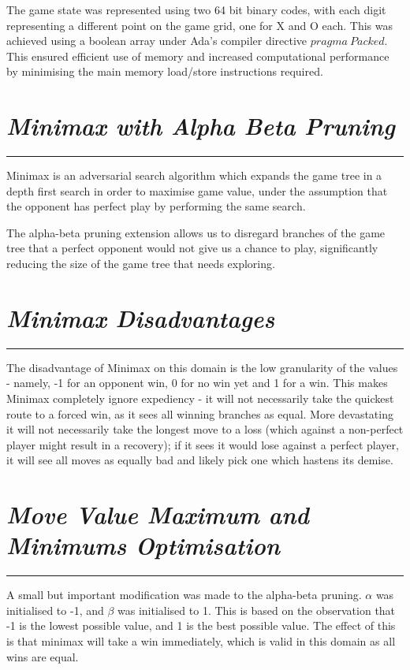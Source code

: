 \documentclass[10pt]{report}
\begin{document}
\begin{multicols}{2}
The game state was represented using two 64 bit binary codes, with each digit representing a different point on the game grid, one for X and O each. This was achieved using a boolean array under Ada's compiler directive $pragma~Packed$. This ensured efficient use of memory and increased computational performance by minimising the main memory load/store instructions required.

\section*{\emph{{Minimax with Alpha Beta Pruning}}}
\hrule
\vspace{0.4cm}

Minimax is an adversarial search algorithm which expands the game tree in a depth first search in order to maximise game value, under the assumption that the opponent has perfect play by performing the same search.

The alpha-beta pruning extension allows us to disregard branches of the game tree that a perfect opponent would not give us a chance to play, significantly reducing the size of the game tree that needs exploring.

\section*{\emph{\textmd{Minimax Disadvantages}}}
\hrule
\vspace{0.4cm}

The disadvantage of Minimax on this domain is the low granularity of the values - namely, -1 for an opponent win, 0 for no win yet and 1 for a win. This makes Minimax completely ignore expediency - it will not necessarily take the quickest route to a forced win, as it sees all winning branches as equal. More devastating it will not necessarily take the longest move to a loss (which against a non-perfect player might result in a recovery); if it sees it would lose against a perfect player, it will see all moves as equally bad and likely pick one which hastens its demise.

\section*{\emph{\textmd{Move Value Maximum and Minimums Optimisation}}}
\hrule
\vspace{0.4cm}

A small but important modification was made to the alpha-beta pruning. $\alpha$ was initialised to -1, and $\beta$ was initialised to 1. This is based on the observation that -1 is the lowest possible value, and 1 is the best possible value. The effect of this is that minimax will take a win immediately, which is valid in this domain as all wins are equal.


\end{multicols}
\end{document}
